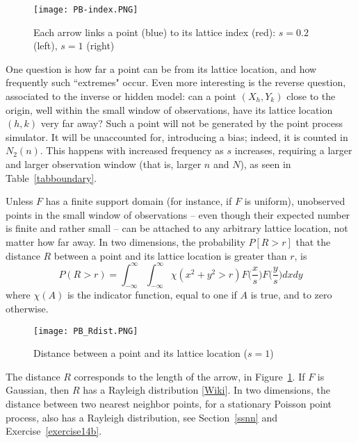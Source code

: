 \documentclass[10pt]{article}
\begin{document}
 
\begin{figure}[H]
\centering
\texttt{[image: PB-index.PNG]}
\caption{Each arrow links a point (blue) to its lattice index (red): $s=0.2$ (left), $s=1$ (right)}
\label{fig:index}
\end{figure}

One question is how far a point can be from its lattice location, and how frequently such ``extremes" occur. Even more interesting is the reverse question, associated to the 
inverse or \textcolor{index}{hidden model}: can a point $(X_h,Y_k)$ close to the origin, well within the small window of observations, have its lattice location 
$(h,k)$ very far away? Such a point  will not be generated by the point process simulator. It will be unaccounted for, introducing a bias; indeed, it is counted in $N_2(n)$. This happens with increased frequency as $s$ increases, requiring a larger and larger observation window (that is, larger $n$ and $N$), as seen in Table~\ref{tabboundary}. 

Unless $F$ has a finite support domain (for instance, if $F$ is uniform), unobserved points in the small window of observations -- even though their expected number is finite and rather small -- can be attached to any arbitrary lattice location, not matter how far away. In two dimensions, the probability $P[R>r]$ that the distance $R$ between a point and its lattice location is greater than $r$, is
$$P(R>r)=\int_{-\infty}^\infty \int_{-\infty}^\infty  \chi(x^2+y^2 > r) F\Big(\frac{x}{s}\Big)F\Big(\frac{y}{s}\Big)dx dy$$
where $\chi(A)$ is the indicator function, equal to one if $A$ is true, and to zero otherwise. 

\begin{figure}%
\centering
\texttt{[image: PB\_Rdist.PNG]}
\caption{Distance between a point and its lattice location ($s=1$)}
\label{fig:index2}
\end{figure}

The distance $R$ corresponds to the length of the arrow, in Figure~\ref{fig:index}. If $F$ is Gaussian, then $R$ has a 
\textcolor{index}{Rayleigh distribution}  [\href{https://en.wikipedia.org/wiki/Rayleigh_distribution}{Wiki}]. In two dimensions, the distance between
two nearest neighbor points, for a stationary Poisson point process, also has a Rayleigh distribution, see Section~\ref{ssnn} and Exercise~\ref{exercise14b}. \\
\end{document}
